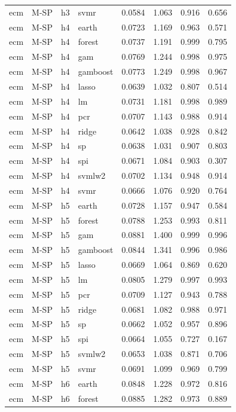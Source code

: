 \begin{ThreePartTable}
\begin{longtable}[t]{llclcccc}
ecm & M-SP & h3 & svmr & 0.0584 & 1.063 & 0.916 & 0.656\\
\addlinespace
ecm & M-SP & h4 & earth & 0.0723 & 1.169 & 0.963 & 0.571\\
ecm & M-SP & h4 & forest & 0.0737 & 1.191 & 0.999 & 0.795\\
ecm & M-SP & h4 & gam & 0.0769 & 1.244 & 0.998 & 0.975\\
ecm & M-SP & h4 & gamboost & 0.0773 & 1.249 & 0.998 & 0.967\\
ecm & M-SP & h4 & lasso & 0.0639 & 1.032 & 0.807 & 0.514\\
ecm & M-SP & h4 & lm & 0.0731 & 1.181 & 0.998 & 0.989\\
ecm & M-SP & h4 & pcr & 0.0707 & 1.143 & 0.988 & 0.914\\
ecm & M-SP & h4 & ridge & 0.0642 & 1.038 & 0.928 & 0.842\\
ecm & M-SP & h4 & sp & 0.0638 & 1.031 & 0.907 & 0.803\\
ecm & M-SP & h4 & spi & 0.0671 & 1.084 & 0.903 & 0.307\\
ecm & M-SP & h4 & svmlw2 & 0.0702 & 1.134 & 0.948 & 0.914\\
ecm & M-SP & h4 & svmr & 0.0666 & 1.076 & 0.920 & 0.764\\
\addlinespace
ecm & M-SP & h5 & earth & 0.0728 & 1.157 & 0.947 & 0.584\\
ecm & M-SP & h5 & forest & 0.0788 & 1.253 & 0.993 & 0.811\\
ecm & M-SP & h5 & gam & 0.0881 & 1.400 & 0.999 & 0.996\\
ecm & M-SP & h5 & gamboost & 0.0844 & 1.341 & 0.996 & 0.986\\
ecm & M-SP & h5 & lasso & 0.0669 & 1.064 & 0.869 & 0.620\\
ecm & M-SP & h5 & lm & 0.0805 & 1.279 & 0.997 & 0.993\\
ecm & M-SP & h5 & pcr & 0.0709 & 1.127 & 0.943 & 0.788\\
ecm & M-SP & h5 & ridge & 0.0681 & 1.082 & 0.988 & 0.971\\
ecm & M-SP & h5 & sp & 0.0662 & 1.052 & 0.957 & 0.896\\
ecm & M-SP & h5 & spi & 0.0664 & 1.055 & 0.727 & 0.167\\
ecm & M-SP & h5 & svmlw2 & 0.0653 & 1.038 & 0.871 & 0.706\\
ecm & M-SP & h5 & svmr & 0.0691 & 1.099 & 0.969 & 0.799\\
\addlinespace
ecm & M-SP & h6 & earth & 0.0848 & 1.228 & 0.972 & 0.816\\
ecm & M-SP & h6 & forest & 0.0885 & 1.282 & 0.973 & 0.889\\

\end{longtable}
\end{ThreePartTable}
